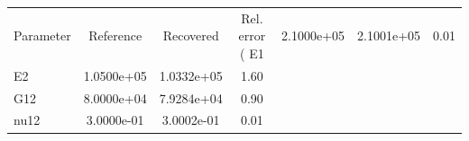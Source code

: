 \begin{tabular}{lccc}
\toprule
Parameter & Reference & Recovered & Rel. error (%
\midrule
E1 & 2.1000e+05 & 2.1001e+05 & 0.01 \\
E2 & 1.0500e+05 & 1.0332e+05 & 1.60 \\
G12 & 8.0000e+04 & 7.9284e+04 & 0.90 \\
nu12 & 3.0000e-01 & 3.0002e-01 & 0.01 \\
\bottomrule
\end{tabular}
